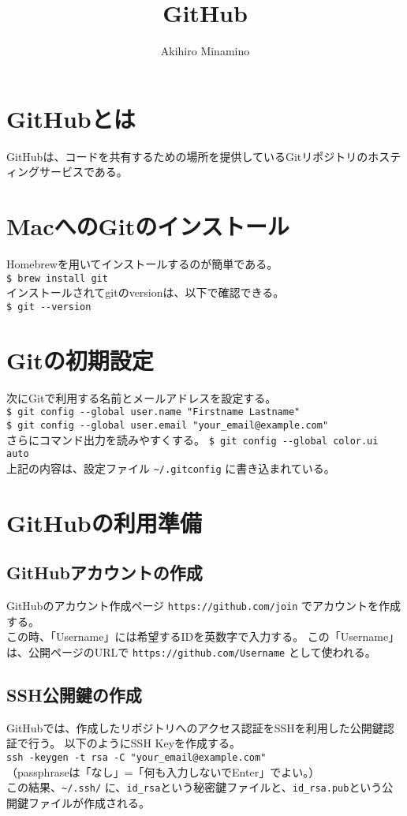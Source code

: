 \documentclass[11pt, oneside]{article}   	%
\title{GitHub}
\author{Akihiro Minamino}
\begin{document}
\maketitle
\section{GitHubとは}
GitHubは、コードを共有するための場所を提供しているGitリポジトリのホスティングサービスである。\\

\section{MacへのGitのインストール}
Homebrewを用いてインストールするのが簡単である。\\
\verb|$ brew install git|\\
インストールされてgitのversionは、以下で確認できる。\\
\verb|$ git --version|\\

\section{Gitの初期設定}
次にGitで利用する名前とメールアドレスを設定する。\\
\verb|$ git config --global user.name "Firstname Lastname"|\\
\verb|$ git config --global user.email "your_email@example.com"|\\
さらにコマンド出力を読みやすくする。
\verb|$ git config --global color.ui auto|\\
上記の内容は、設定ファイル \verb|~/.gitconfig| に書き込まれている。\\

\section{GitHubの利用準備}
\subsection{GitHubアカウントの作成}
GitHubのアカウント作成ページ \verb|https://github.com/join| でアカウントを作成する。\\
この時、「Username」には希望するIDを英数字で入力する。
この「Username」は、公開ページのURLで \verb|https://github.com/Username| として使われる。\\

\subsection{SSH公開鍵の作成}
GitHubでは、作成したリポジトリへのアクセス認証をSSHを利用した公開鍵認証で行う。
以下のようにSSH Keyを作成する。\\
\verb|ssh -keygen -t rsa -C "your_email@example.com"|\\
（passphraseは「なし」=「何も入力しないでEnter」でよい。）\\
この結果、\verb|~/.ssh/| に、\verb|id_rsa|という秘密鍵ファイルと、\verb|id_rsa.pub|という公開鍵ファイルが作成される。\\
\end{document}
